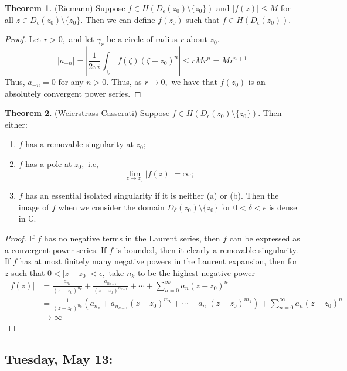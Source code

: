 \documentclass[10pt, oneside]{article}
\newcommand{\bbC}{\mathbb{C}}
\newcommand{\sm}{\setminus}
\theoremstyle{definition}
\newtheorem{thm}{Theorem}
\begin{document}
\begin{thm}
    (Riemann) Suppose $f \in H(D_{\epsilon}(z_0) \sm \{z_0\})$ and $|f(z)| \leq M$ for all $z \in D_{\epsilon}(z_0) \sm \{z_0\}.$ Then we can define $f(z_0)$ such that $f \in H(D_\epsilon(z_0)).$
\end{thm}
\begin{proof}
    Let $r>0,$ and let $\gamma_r$ be a circle of radius $r$ about $z_0.$ 
    \[|a_{-n}| = \left|\frac{1}{2\pi i}\int_{\gamma_r} f(\zeta)(\zeta - z_0)^n\right| \leq r M r ^n = Mr^{n+1}\] Thus, $a_{-n} = 0$ for any $n >0.$ Thus, as $r \to 0,$ we have that $f(z_0)$ is an absolutely convergent power series.
\end{proof}

\begin{thm}
    (Weierstrass-Casserati) Suppose $f\in H(D_\epsilon(z_0)\sm \{z_0\}).$ Then either:
    \begin{enumerate}
        \item $f$ has a removable singularity at $z_0;$
        \item $f$ has a pole at $z_0,$ i.e, 
        \[\lim_{z\to z_0}|f(z)| = \infty;\]
        \item $f$ has an essential isolated singularity if it is neither (a) or (b). Then the image of $f$ when we consider the domain $D_\delta(z_0) \sm \{z_0\}$ for $0 < \delta < \epsilon$ is dense in $\bbC.$
    \end{enumerate}
\end{thm}

\begin{proof}
    If $f$ has no negative terms in the Laurent series, then $f$ can be expressed as a convergent power series. If $f$ is bounded, then it clearly a removable singularity. If $f$ has at most finitely many negative powers in the Laurent expansion, then for $z$ such that $0 < |z - z_0| < \epsilon,$ take $n_k$ to be the highest negative power
    \begin{align*}
    |f(z)| &= \frac{a_{n_k}}{(z - z_0)^{n_k}} + \frac{a_{n_{k=1}}}{(z - z_0)^{n_{k-1}}} + \cdots+ \sum_{n=0}^\infty a_n (z - z_0)^n\\ &=  \frac{1}{(z - z_0)^{n_k}}\left(a_{n_k}+ a_{n_{k-1}}(z - z_0)^{m_k} + \cdots + a_{n_1}(z - z_0)^{m_1} \right) + \sum_{n=0}^\infty a_n (z - z_0)^n \\
    &\to \infty
    \end{align*}
\end{proof}

\newpage
\subsection{Tuesday, May 13: }
\end{document}
